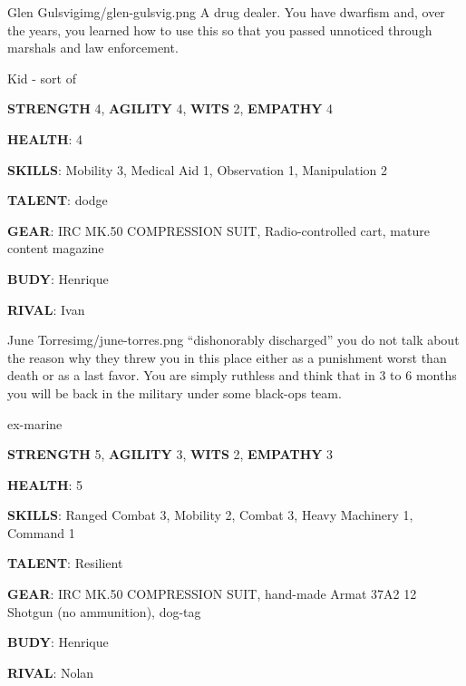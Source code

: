 \newsect

\begin{rpg-pcbox}{Glen Gulsvig}{img/glen-gulsvig.png}
    A drug dealer. You have dwarfism and, over the years, you learned how to use this so that you passed unnoticed through marshals and law enforcement. 
\end{rpg-pcbox}

\begin{rpg-commentbox}{}
    Kid - sort of

    \textbf{STRENGTH} 4, \textbf{AGILITY} 4, \textbf{WITS} 2, \textbf{EMPATHY} 4

    \textbf{HEALTH}: 4

    \textbf{SKILLS}: Mobility 3, Medical Aid 1, Observation 1, Manipulation 2
    
    \textbf{TALENT}: dodge
    
    \textbf{GEAR}: IRC MK.50 COMPRESSION SUIT, Radio-controlled cart, mature content magazine

    \textbf{BUDY}: Henrique
    
    \textbf{RIVAL}: Ivan
\end{rpg-commentbox}

\newsect

\medskip \medskip \medskip \medskip \medskip \medskip \medskip \medskip \medskip \medskip \medskip \medskip 
\medskip \medskip \medskip \medskip \medskip \medskip \medskip \medskip \medskip \medskip \medskip \medskip 


\begin{rpg-pcbox}{June Torres}{img/june-torres.png}
    ``dishonorably discharged'' you do not talk about the reason why they threw you in this place either as a punishment worst than death or as a last favor. You are simply ruthless and think that in 3 to 6 months you will be back in the military under some black-ops team.
\end{rpg-pcbox}

\begin{rpg-commentbox}{}
    ex-marine

    \textbf{STRENGTH} 5, \textbf{AGILITY} 3, \textbf{WITS} 2, \textbf{EMPATHY} 3

    \textbf{HEALTH}: 5

    \textbf{SKILLS}: Ranged Combat 3, Mobility 2, Combat 3, Heavy Machinery 1, Command 1
    
    \textbf{TALENT}: Resilient
    
    \textbf{GEAR}: IRC MK.50 COMPRESSION SUIT, hand-made Armat 37A2 12 Shotgun (no ammunition), dog-tag

    \textbf{BUDY}: Henrique
    
    \textbf{RIVAL}: Nolan
\end{rpg-commentbox}



